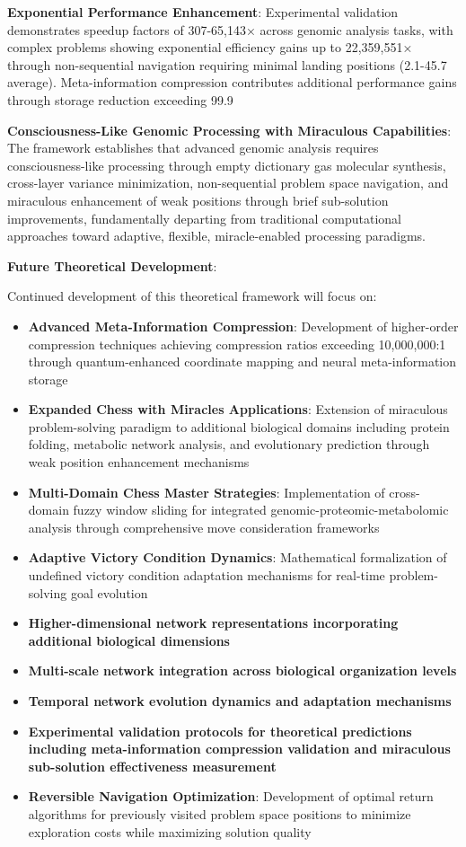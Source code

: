 \documentclass[12pt,a4paper]{article}
\begin{document}
\begin{table}[H]
\textbf{Exponential Performance Enhancement}: Experimental validation demonstrates speedup factors of 307-65,143× across genomic analysis tasks, with complex problems showing exponential efficiency gains up to 22,359,551× through non-sequential navigation requiring minimal landing positions (2.1-45.7 average). Meta-information compression contributes additional performance gains through storage reduction exceeding 99.9%

\textbf{Consciousness-Like Genomic Processing with Miraculous Capabilities}: The framework establishes that advanced genomic analysis requires consciousness-like processing through empty dictionary gas molecular synthesis, cross-layer variance minimization, non-sequential problem space navigation, and miraculous enhancement of weak positions through brief sub-solution improvements, fundamentally departing from traditional computational approaches toward adaptive, flexible, miracle-enabled processing paradigms.

\textbf{Future Theoretical Development}:

Continued development of this theoretical framework will focus on:
\begin{itemize}
\item \textbf{Advanced Meta-Information Compression}: Development of higher-order compression techniques achieving compression ratios exceeding 10,000,000:1 through quantum-enhanced coordinate mapping and neural meta-information storage
\item \textbf{Expanded Chess with Miracles Applications}: Extension of miraculous problem-solving paradigm to additional biological domains including protein folding, metabolic network analysis, and evolutionary prediction through weak position enhancement mechanisms
\item \textbf{Multi-Domain Chess Master Strategies}: Implementation of cross-domain fuzzy window sliding for integrated genomic-proteomic-metabolomic analysis through comprehensive move consideration frameworks
\item \textbf{Adaptive Victory Condition Dynamics}: Mathematical formalization of undefined victory condition adaptation mechanisms for real-time problem-solving goal evolution
\item \textbf{Higher-dimensional network representations incorporating additional biological dimensions}
\item \textbf{Multi-scale network integration across biological organization levels}
\item \textbf{Temporal network evolution dynamics and adaptation mechanisms}
\item \textbf{Experimental validation protocols for theoretical predictions including meta-information compression validation and miraculous sub-solution effectiveness measurement}
\item \textbf{Reversible Navigation Optimization}: Development of optimal return algorithms for previously visited problem space positions to minimize exploration costs while maximizing solution quality
\end{itemize}


\end{table}
\end{document}
